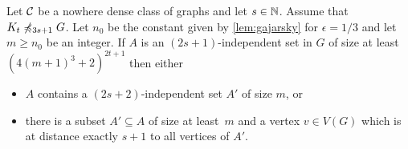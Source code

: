 \begin{lemma}\label{lem:apex}
Let $\mathcal{C}$ be a nowhere dense class of graphs and let $s\in \mathbb{N}$. 
Assume that $K_t\not\preccurlyeq_{3s+1} G$. 
Let $n_0$ be the constant given by \cref{lem:gajarsky} for $\epsilon=1/3$ 
and let $m\geq n_0$ be an integer. 
If $A$ is an $(2s+1)$-independent set in $G$ of size at least $(4(m+1)^3+2)^{2t+1}$ 
then either 
\begin{itemize}
\item $A$ contains a $(2s+2)$-independent set $A'$ of size $m$, or
\item there is a subset $A'\subseteq A$ of size at least~$m$ and
a vertex $v\in V(G)$ which is at distance exactly $s+1$ to all vertices of $A'$. 
\end{itemize}
\end{lemma}




     


